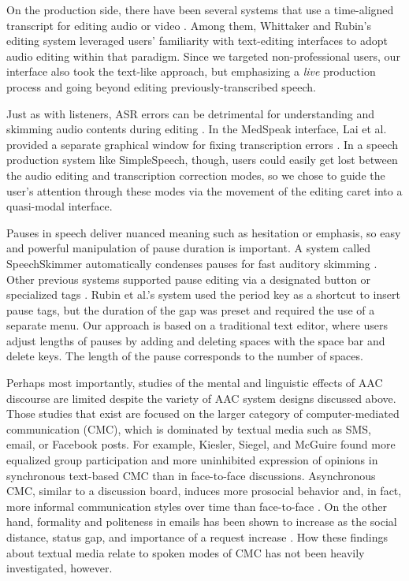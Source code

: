 On the production side, there have been several systems that use a time-aligned transcript for editing audio \cite{rubin,whittaker_semantic,yoon} or video \cite{Berthouzoz:2012,casares}. 
Among them, Whittaker and Rubin's editing system leveraged users' familiarity with text-editing interfaces to adopt audio editing within that paradigm. 
Since we targeted non-professional users, our interface also took the text-like approach, but emphasizing a \emph{live} production process and going beyond editing previously-transcribed speech. 

Just as with listeners, ASR errors can be detrimental for understanding and skimming audio contents during editing \cite{halverson1999beauty}. 
In the MedSpeak interface, Lai et al. provided a separate graphical window for fixing transcription errors \cite{Lai:1997}. 
In a speech production system like SimpleSpeech, though, users could easily get lost between the audio editing and transcription correction modes, so we chose to guide the user's attention through these modes via the movement of the editing caret into a quasi-modal interface.

Pauses in speech deliver nuanced meaning such as hesitation or emphasis, so easy and powerful manipulation of pause duration is important. 
A system called SpeechSkimmer automatically condenses pauses for fast auditory skimming \cite{arons:1993}. 
Other previous systems supported pause editing via a designated button \cite{Berthouzoz:2012} or specialized tags \cite{rubin}. 
Rubin et al.'s system used the period key as a shortcut to insert pause tags, but the duration of the gap was preset and required the use of a separate menu. 
Our approach is based on a traditional text editor, where users adjust lengths of pauses by adding and deleting spaces with the space bar and delete keys. The length of the pause corresponds to the number of spaces.

Perhaps most importantly, studies of the mental and linguistic effects of AAC discourse are limited despite the variety of AAC system designs discussed above.
Those studies that exist are focused on the larger category of computer-mediated communication (CMC), which is dominated by textual media such as SMS, email, or Facebook posts.
For example, Kiesler, Siegel, and McGuire \cite{kiesler} found more equalized group participation and more uninhibited expression of opinions in synchronous text-based CMC than in face-to-face discussions.
Asynchronous CMC, similar to a discussion board, induces more prosocial behavior and, in fact, more informal communication styles over time than face-to-face \cite{walther}.
On the other hand, formality and politeness in emails has been shown to increase as the social distance, status gap, and importance of a request increase \cite{cho}.
How these findings about textual media relate to spoken modes of CMC has not been heavily investigated, however.
